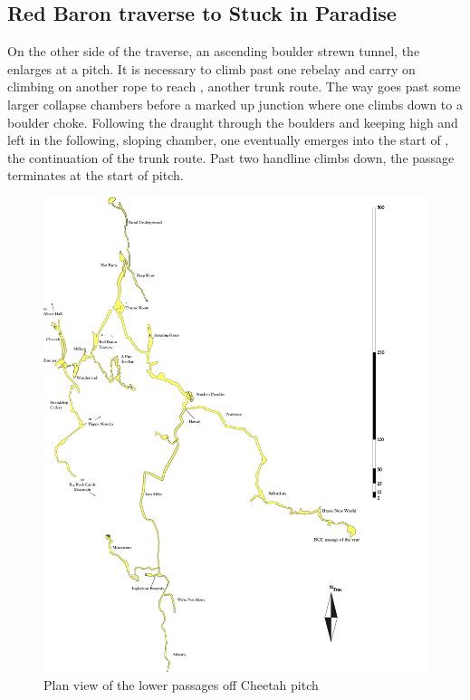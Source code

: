 \subsection{Red Baron traverse to Stuck in Paradise}
On the other side of the traverse, an ascending boulder strewn tunnel, the  enlarges at a pitch. It is necessary to climb past one rebelay and carry on climbing on another rope to reach , another trunk route. The way goes past some larger collapse chambers before a marked up junction where one climbs down to a boulder choke. Following the draught through the boulders and keeping high and left in the following, sloping chamber, one eventually emerges into the start of , the continuation of the trunk route. Past two handline climbs down, the passage terminates at the start of  pitch.

\begin{figure}[t!]
\checkoddpage \ifoddpage \forcerectofloat \else \forceversofloat \fi
\centering
\includegraphics[width=\textwidth]{images/pdf_maps/paradise.pdf}
\caption{Plan view of the lower passages off Cheetah pitch}
\label{paradise}
\end{figure}

